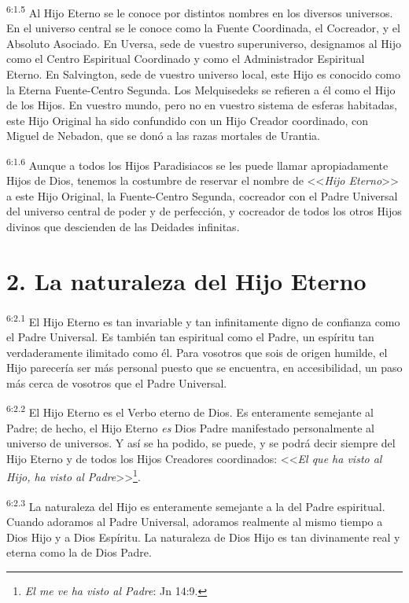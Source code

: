\par
\textsuperscript{6:1.5} Al Hijo Eterno se le conoce por distintos nombres en los diversos universos. En el universo central se le conoce como la Fuente Coordinada, el Cocreador, y el Absoluto Asociado. En Uversa, sede de vuestro superuniverso, designamos al Hijo como el Centro Espiritual Coordinado y como el Administrador Espiritual Eterno. En Salvington, sede de vuestro universo local, este Hijo es conocido como la Eterna Fuente-Centro Segunda. Los Melquisedeks se refieren a él como el Hijo de los Hijos. En vuestro mundo, pero no en vuestro sistema de esferas habitadas, este Hijo Original ha sido confundido con un Hijo Creador coordinado, con Miguel de Nebadon, que se donó a las razas mortales de Urantia.

\par
\textsuperscript{6:1.6} Aunque a todos los Hijos Paradisiacos se les puede llamar apropiadamente Hijos de Dios, tenemos la costumbre de reservar el nombre de <<\textit{Hijo Eterno}>> a este Hijo Original, la Fuente-Centro Segunda, cocreador con el Padre Universal del universo central de poder y de perfección, y cocreador de todos los otros Hijos divinos que descienden de las Deidades infinitas.

\section*{2. La naturaleza del Hijo Eterno}
\par
\textsuperscript{6:2.1} El Hijo Eterno es tan invariable y tan infinitamente digno de confianza como el Padre Universal. Es también tan espiritual como el Padre, un espíritu tan verdaderamente ilimitado como él. Para vosotros que sois de origen humilde, el Hijo parecería ser más personal puesto que se encuentra, en accesibilidad, un paso más cerca de vosotros que el Padre Universal.

\par
\textsuperscript{6:2.2} El Hijo Eterno es el Verbo eterno de Dios. Es enteramente semejante al Padre; de hecho, el Hijo Eterno \textit{es} Dios Padre manifestado personalmente al universo de universos. Y así se ha podido, se puede, y se podrá decir siempre del Hijo Eterno y de todos los Hijos Creadores coordinados: <<\textit{El que ha visto al Hijo, ha visto al Padre}>>\footnote{\textit{El me ve ha visto al Padre}: Jn 14:9.}.

\par
\textsuperscript{6:2.3} La naturaleza del Hijo es enteramente semejante a la del Padre espiritual. Cuando adoramos al Padre Universal, adoramos realmente al mismo tiempo a Dios Hijo y a Dios Espíritu. La naturaleza de Dios Hijo es tan divinamente real y eterna como la de Dios Padre.

